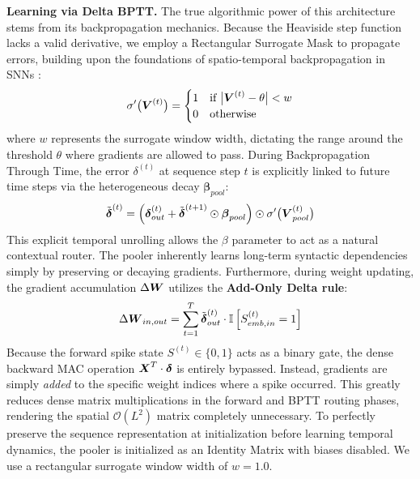 \documentclass[10pt]{article} %
\begin{document}
\textbf{Learning via Delta BPTT.} The true algorithmic power of this architecture stems from its backpropagation mechanics. Because the Heaviside step function lacks a valid derivative, we employ a Rectangular Surrogate Mask to propagate errors, building upon the foundations of spatio-temporal backpropagation in SNNs \citep{neftci2019surrogate}:
\begin{equation}
\sigma'\big(\boldsymbol{V}^{(t)}\big) = \begin{cases} 1 & \text{if } \big|\boldsymbol{V}^{(t)} - \theta\big| < w \\ 0 & \text{otherwise} \end{cases}
\end{equation}
where $w$ represents the surrogate window width, dictating the range around the threshold $\theta$ where gradients are allowed to pass. During Backpropagation Through Time, the error $\delta^{(t)}$ at sequence step $t$ is explicitly linked to future time steps via the heterogeneous decay $\bm{\beta}_{pool}$:
\begin{equation}
\tilde{\boldsymbol{\delta}}^{(t)} = \left( \boldsymbol{\delta}_{out}^{(t)} + \tilde{\boldsymbol{\delta}}^{(t+1)} \odot \boldsymbol{\beta}_{pool} \right) \odot \sigma'\big(\boldsymbol{V}_{pool}^{(t)}\big)
\end{equation}
This explicit temporal unrolling allows the $\beta$ parameter to act as a natural contextual router. The pooler inherently learns long-term syntactic dependencies simply by preserving or decaying gradients. Furthermore, during weight updating, the gradient accumulation $\Delta \boldsymbol{W}$ utilizes the \textbf{Add-Only Delta rule}:
\begin{equation}
\Delta \boldsymbol{W}_{in, out} = \sum_{t=1}^{T} \tilde{\boldsymbol{\delta}}^{(t)}_{out} \cdot \mathbb{I}\left[ S_{emb, in}^{(t)} = 1 \right]
\end{equation}
Because the forward spike state $S^{(t)} \in \{0, 1\}$ acts as a binary gate, the dense backward MAC operation $\boldsymbol{X}^T \cdot \boldsymbol{\delta}$ is entirely bypassed. Instead, gradients are simply \textit{added} to the specific weight indices where a spike occurred. This greatly reduces dense matrix multiplications in the forward and BPTT routing phases, rendering the spatial $\mathcal{O}(L^2)$ matrix completely unnecessary. To perfectly preserve the sequence representation at initialization before learning temporal dynamics, the pooler is initialized as an Identity Matrix with biases disabled. We use a rectangular surrogate window width of $w=1.0$.
\end{document}
